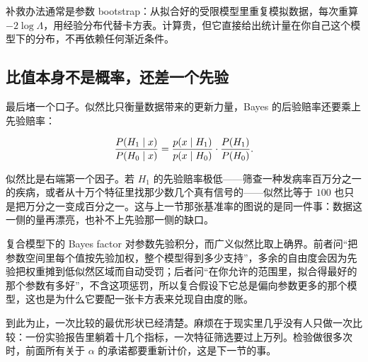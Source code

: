 补救办法通常是参数 bootstrap：从拟合好的受限模型里重复模拟数据，每次重算 \(-2\log\Lambda\)，用经验分布代替卡方表。计算贵，但它直接给出统计量在你自己这个模型下的分布，不再依赖任何渐近条件。

\subsection{比值本身不是概率，还差一个先验}

最后堵一个口子。似然比只衡量数据带来的更新力量，Bayes 的后验赔率还要乘上先验赔率：

\[
\frac{P(H_1\mid x)}{P(H_0\mid x)}
=\frac{p(x\mid H_1)}{p(x\mid H_0)}\cdot\frac{P(H_1)}{P(H_0)} .
\]

似然比是右端第一个因子。若 \(H_1\) 的先验赔率极低——筛查一种发病率百万分之一的疾病，或者从十万个特征里找那少数几个真有信号的——似然比等于 \(100\) 也只是把万分之一变成百分之一。这与上一节那张基准率的图说的是同一件事：数据这一侧的量再漂亮，也补不上先验那一侧的缺口。

复合模型下的 Bayes factor 对参数先验积分，而广义似然比取上确界。前者问``把参数空间里每个值按先验加权，整个模型得到多少支持''，多余的自由度会因为先验把权重摊到低似然区域而自动受罚；后者问``在你允许的范围里，拟合得最好的那个参数有多好''，不含这项惩罚，所以复合假设下它总是偏向参数更多的那个模型，这也是为什么它要配一张卡方表来兑现自由度的账。

到此为止，一次比较的最优形状已经清楚。麻烦在于现实里几乎没有人只做一次比较：一份实验报告里躺着十几个指标，一次特征筛选要过上万列。检验做很多次时，前面所有关于 \(\alpha\) 的承诺都要重新计价，这是下一节的事。
